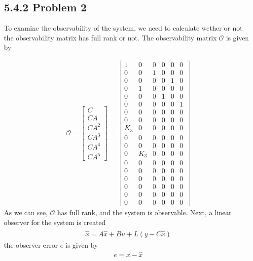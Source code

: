 \newpage
{}
\subsection*{5.4.2 Problem 2}
To examine the observability of the system, we need to calculate wether or not the observability matrix has full rank or not. The observability matrix $\mathcal{O}$ is given by

\begin{align*}
\mathcal{O} = \begin{bmatrix}
C\\
CA\\
CA^2\\
CA^3\\
CA^4\\
CA^5
\end{bmatrix}
=
\begin{bmatrix}
1 & 0 & 0 & 0 & 0 & 0\\
0 & 0 & 1 & 0 & 0 & 0\\
0 & 0 & 0 & 0 & 1 & 0\\
0 & 1 & 0 & 0 & 0 & 0\\
0 & 0 & 0 & 1 & 0 & 0\\
0 & 0 & 0 & 0 & 0 & 1\\
0 & 0 & 0 & 0 & 0 & 0\\
0 & 0 & 0 & 0 & 0 & 0\\
K_3 & 0 & 0 & 0 & 0 & 0\\
0 & 0 & 0 & 0 & 0 & 0\\
0 & 0 & 0 & 0 & 0 & 0\\
0 & K_3 & 0 & 0 & 0 & 0\\
0 & 0 & 0 & 0 & 0 & 0\\
0 & 0 & 0 & 0 & 0 & 0\\
0 & 0 & 0 & 0 & 0 & 0\\
0 & 0 & 0 & 0 & 0 & 0\\
0 & 0 & 0 & 0 & 0 & 0\\
0 & 0 & 0 & 0 & 0 & 0
\end{bmatrix}
\end{align*}
As we can see, $\mathcal{O}$ has full rank, and the system is observable. Next, a linear observer for the system is created
\begin{align*}
\dot{\hat{x}} = A\hat{x} + Bu + L(y - C\hat{x})
\end{align*}
the observer error $e$ is given by
\begin{align*}
e =  x -\hat{x}
\end{align*}
